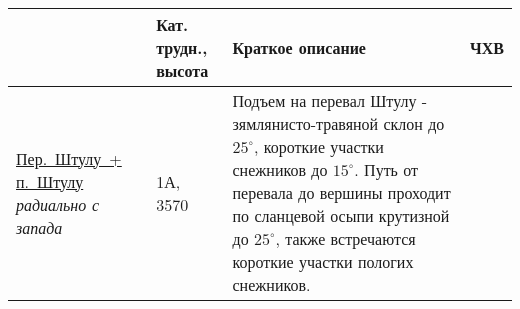 {%
%
%		
%
		 \begin{longtable}{|>{\centering\arraybackslash}m{4.5cm}|>{\centering\arraybackslash}m{1.8cm}|>{\raggedright\arraybackslash}m{9.6cm}|>{\centering\arraybackslash}m{1.2cm}|} \hline
		 	{Препятствие}																																					&	{Кат. трудн., высота}		&	{Краткое описание}																																																																																																																																																																																																																																																																																																																																												&	{ЧХВ}	\\ \hline
		 	\hyperref[subsec:Day2]{{\small Пер.~Штулу~+ п.~Штулу}}														\newline\textit{радиально с запада}		&	1А, 3570					&	{\small Подъем на перевал Штулу - зямлянисто-травяной склон до $25^\circ$, короткие участки снежников до $15^\circ$. Путь от перевала до вершины проходит по сланцевой осыпи крутизной до $25^\circ$, также встречаются короткие участки пологих снежников.}
		 	

\end{longtable}}
